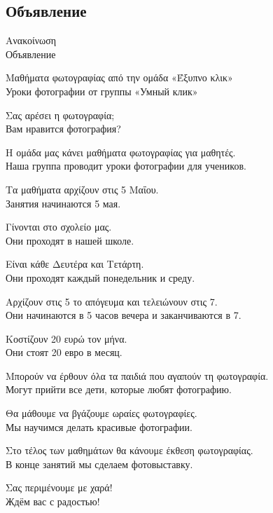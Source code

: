 \documentclass[12pt]{article}
\newcommand{\my}[1]{\textcolor{gray!80!white}{#1}}
\newenvironment{page}{\clearpage\normalsize\null\vfill}{\vfill\null}
\newenvironment{textblock}{\begin{minipage}{\textwidth}}{\end{minipage}\smallskip}
\begin{document}
	\begin{page}
		\subsection{Объявление}
		\footnotesize
		\begin{textblock}
			Ανακοίνωση\\
			\my{Объявление}
			
			Μαθήματα φωτογραφίας από την ομάδα «Έξυπνο κλικ»\\
			\my{Уроки фотографии от группы «Умный клик»}
			
			Σας αρέσει η φωτογραφία;\\
			\my{Вам нравится фотография?}
			
			Η ομάδα μας κάνει μαθήματα φωτογραφίας για μαθητές.\\
			\my{Наша группа проводит уроки фотографии для учеников.}
			
			Τα μαθήματα αρχίζουν στις 5 Μαΐου.\\
			\my{Занятия начинаются 5 мая.}
			
			Γίνονται στο σχολείο μας.\\
			\my{Они проходят в нашей школе.}
			
			Είναι κάθε Δευτέρα και Τετάρτη.\\
			\my{Они проходят каждый понедельник и среду.}
			
			Αρχίζουν στις 5 το απόγευμα και τελειώνουν στις 7.\\
			\my{Они начинаются в 5 часов вечера и заканчиваются в 7.}
			
			Κοστίζουν 20 ευρώ τον μήνα.\\
			\my{Они стоят 20 евро в месяц.}
			
			Μπορούν να έρθουν όλα τα παιδιά που αγαπούν τη φωτογραφία.\\
			\my{Могут прийти все дети, которые любят фотографию.}
			
			Θα μάθουμε να βγάζουμε ωραίες φωτογραφίες.\\
			\my{Мы научимся делать красивые фотографии.}
			
			Στο τέλος των μαθημάτων θα κάνουμε έκθεση φωτογραφίας.\\
			\my{В конце занятий мы сделаем фотовыставку.}
			
			Σας περιμένουμε με χαρά!\\
			\my{Ждём вас с радостью!}
		\end{textblock}
	\end{page}
	
\end{document}

